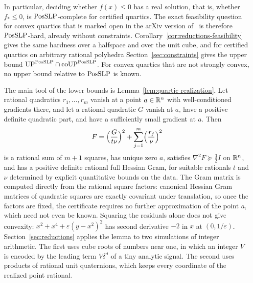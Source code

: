 In particular, deciding whether $f(x)\le0$ has a real solution, that is,
whether $f_*\le0$, is $\mathrm{PosSLP}$-complete for certified quartics. The exact
feasibility question for convex quartics that is marked open in the arXiv
version of~\cite{SlotSteurerWiedmer2025} is therefore $\mathrm{PosSLP}$-hard, already
without constraints. Corollary~\ref{cor:reductions-feasibility} gives
the same hardness over a halfspace and over the unit cube, and for certified
quartics on arbitrary rational polyhedra Section~\ref{sec:constraints} gives
the upper bound $\mathrm{UP}^{\mathrm{PosSLP}}\cap\mathrm{coUP}^{\mathrm{PosSLP}}$. For convex
quartics that are not strongly convex, no upper bound relative to $\mathrm{PosSLP}$ is
known.

The main tool of the lower bounds is Lemma~\ref{lem:quartic-realization}.
Let rational quadratics $r_1,\ldots,r_m$ vanish at a point $a\in\mathbb R^n$ with
well-conditioned gradients there, and let a rational quadratic $G$ vanish at
$a$, have a positive definite quadratic part, and have a sufficiently small
gradient at $a$. Then
\[
F=\Bigl(\frac{G}{t\nu}\Bigr)^2+\sum_{j=1}^m\Bigl(\frac{r_j}{\nu}\Bigr)^2
\]
is a rational sum of $m+1$ squares, has unique zero $a$, satisfies
$\nabla^2F\succeq\frac32I$ on $\mathbb R^n$, and has a positive definite rational
full Hessian Gram, for suitable rationals $t$ and $\nu$ determined by
explicit quantitative bounds on the data. The Gram matrix is computed
directly from the rational square factors: canonical Hessian Gram matrices of
quadratic squares are exactly covariant under translation, so once the
factors are fixed, the certificate requires no further approximation of the
point $a$, which need not even be known. Squaring the residuals alone does not
give convexity: $x^2+x^4+\varepsilon(y-x^2)^2$ has second derivative $-2$ in
$x$ at $(0,1/\varepsilon)$. Section~\ref{sec:reductions} applies the lemma to
two simulations of integer arithmetic. The first uses cube roots of numbers
near one, in which an integer $V$ is encoded by the leading term $V\delta^d$
of a tiny analytic signal. The second uses products of rational unit
quaternions, which keeps every coordinate of the realized point rational.


